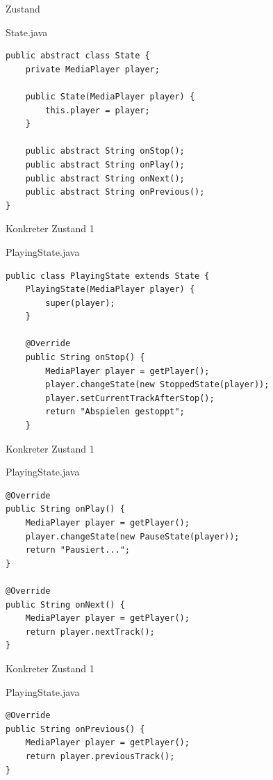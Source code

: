\begin{frame}[fragile]{Zustand}
	\begin{exampleblock}{State.java}
     	  \begin{lstlisting}
public abstract class State {
    private MediaPlayer player;

    public State(MediaPlayer player) {
        this.player = player;
    }

    public abstract String onStop();
    public abstract String onPlay();
    public abstract String onNext();
    public abstract String onPrevious();
}      
     	  \end{lstlisting}
 	\end{exampleblock}
\end{frame}

\begin{frame}[fragile]{Konkreter Zustand 1}
	\begin{exampleblock}{PlayingState.java}
 		\begin{lstlisting}
public class PlayingState extends State {
    PlayingState(MediaPlayer player) {
        super(player);
    }

    @Override
    public String onStop() {
    	MediaPlayer player = getPlayer();
        player.changeState(new StoppedState(player));
        player.setCurrentTrackAfterStop();
        return "Abspielen gestoppt";
    }    
 		\end{lstlisting}
 	\end{exampleblock}
\end{frame}

\begin{frame}[fragile]{Konkreter Zustand 1}
	\begin{exampleblock}{PlayingState.java}
 		\begin{lstlisting}
@Override
public String onPlay() {
    MediaPlayer player = getPlayer();
    player.changeState(new PauseState(player));
    return "Pausiert...";
}

@Override
public String onNext() {
    MediaPlayer player = getPlayer();
    return player.nextTrack();
} 
 		\end{lstlisting}
 	\end{exampleblock}
\end{frame}

\begin{frame}[fragile]{Konkreter Zustand 1}
	\begin{exampleblock}{PlayingState.java}
 		\begin{lstlisting}
@Override
public String onPrevious() {
    MediaPlayer player = getPlayer();
    return player.previousTrack();
}
 		\end{lstlisting}
 	\end{exampleblock}
\end{frame}

